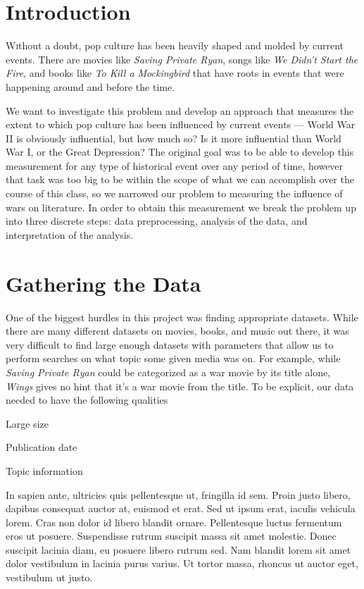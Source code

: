 \documentclass[twoside]{article}
\begin{document}
\begin{multicols}{2}
\section{Introduction}
\lettrine[nindent=0em,lines=3]{W} ithout a doubt, pop culture has been heavily shaped and molded by current events. There are movies like \textit{Saving Private Ryan}, songs like \textit{We Didn't Start the Fire}, and books like \textit{To Kill a Mockingbird} that have roots in events that were happening around and before the time. 

We want to investigate this problem and develop an approach that measures the extent to which pop culture has been influenced by current events --- World War II is obviously influential, but how much so? Is it more influential than World War I, or the Great Depression?  The original goal was to be able to develop this measurement for any type of historical event over any period of time, however that task was too big to be within the scope of what we can accomplish over the course of this class, so we narrowed our problem to measuring the influence of wars on literature. In order to obtain this measurement we break the problem up into three discrete steps: data preprocessing, analysis of the data, and interpretation of the analysis.

\section{Gathering the Data}
One of the biggest hurdles in this project was finding appropriate datasets. While there are many different datasets on movies, books, and music out there, it was very difficult to find large enough datasets with parameters that allow us to perform searches on what topic some given media was on. For example, while \textit{Saving Private Ryan} could be categorized as a war movie by its title alone, \textit{Wings} gives no hint that it's a war movie from the title. To be explicit, our data needed to have the following qualities
\begin{compactitem}
\item Large size
\item Publication date
\item Topic information
\end{compactitem}
In sapien ante, ultricies quis pellentesque ut, fringilla id sem. Proin justo libero, dapibus consequat auctor at, euismod et erat. Sed ut ipsum erat, iaculis vehicula lorem. Cras non dolor id libero blandit ornare. Pellentesque luctus fermentum eros ut posuere. Suspendisse rutrum suscipit massa sit amet molestie. Donec suscipit lacinia diam, eu posuere libero rutrum sed. Nam blandit lorem sit amet dolor vestibulum in lacinia purus varius. Ut tortor massa, rhoncus ut auctor eget, vestibulum ut justo.


\end{multicols}
\end{document}

